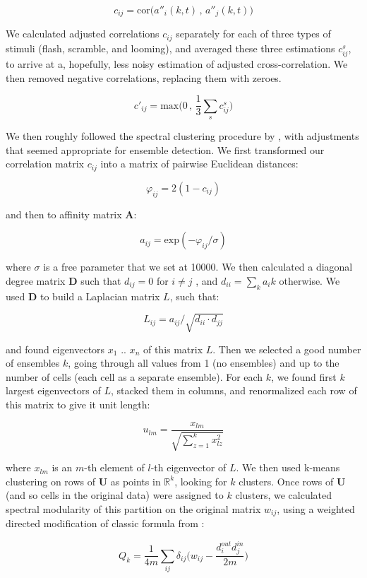 \documentclass{article}
\begin{document}
\[ c_{ij} = \text{cor}\big(a''_i(k,t)\, , \, a''_j(k,t)\big) \]

We calculated adjusted correlations $c_{ij}$ separately for each of three types of stimuli (flash, scramble, and looming), and averaged these three estimations $c_{ij}^s$, to arrive at a, hopefully, less noisy estimation of adjusted cross-correlation. We then removed negative correlations, replacing them with zeroes.

\[ c'_{ij} = \text{max}\big(0 \, , \, \frac{1}{3} \sum_{s}{c_{ij}^s}\big) \]

We then roughly followed the spectral clustering procedure by \citep{ng2002spectral}, with adjustments that seemed appropriate for ensemble detection. We first transformed our correlation matrix $c_{ij}$ into a matrix of pairwise Euclidean distances:

\[ \varphi_{ij} = 2(1-c_{ij}) \]

and then to affinity matrix $\textbf{A}$:

\[ a_{ij} = \text{exp}(-\varphi_{ij}/\sigma) \]

where $\sigma$ is a free parameter that we set at 10000. We then calculated a diagonal degree matrix $\textbf{D}$ such that $d_{ij} = 0$ for $i \neq j$ , and $d_{ii} = \sum_k{a_ik}$ otherwise. We used $\textbf{D}$ to build a Laplacian matrix $L$, such that:

\[ L_{ij} = a_{ij}/\sqrt{d_{ii}\cdot d_{jj}} \]

and found eigenvectors $x_1$ .. $x_n$ of this matrix $L$. Then we selected a good number of ensembles $k$, going through all values from 1 (no ensembles) and up to the number of cells (each cell as a separate ensemble). For each $k$, we found first $k$ largest eigenvectors of $L$, stacked them in columns, and renormalized each row of this matrix to give it unit length:

\[ u_{lm} = \frac{x_{lm}}{\sqrt{\sum_{z=1}^{k}{x_{lz}^2}}} \]

where $x_{lm}$ is an $m$-th element of $l$-th eigenvector of $L$. We then used k-means clustering on rows of $\textbf{U}$ as points in $\mathbb{R}^k$, looking for $k$ clusters. Once rows of $\textbf{U}$ (and so cells in the original data) were assigned to $k$ clusters, we calculated spectral modularity of this partition on the original matrix $w_{ij}$, using a weighted directed modification of classic formula from \citep{newman2006modularity}:

\[ Q_k = \frac{1}{4m}\sum_{ij}{\delta_{ij}\Big(w_{ij}-\frac{d^{out}_i d^{in}_j}{2m}}\Big) \]
\end{document}
